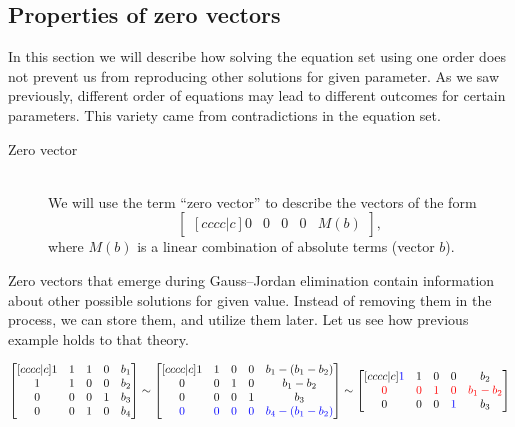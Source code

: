 \subsection{Properties of zero vectors}
In this section we will describe how solving the equation set using one order does not prevent us from reproducing other solutions for given parameter.
As we saw previously, different order of equations may lead to different outcomes for certain parameters.
This variety came from contradictions in the equation set.
\begin{description}
\item[Zero vector]\hfill\\
    We will use the term ``zero vector'' to describe the vectors of the form
    \begin{equation}
    \begin{bmatrix}[cccc|c]
        0 & 0 & 0 & 0 & M(b)
    \end{bmatrix},
    \end{equation}
    where $M(b)$ is a linear combination of absolute terms (vector $b$).
\end{description}
Zero vectors that emerge during Gauss--Jordan elimination contain information about other possible solutions for given value.
Instead of removing them in the process, we can store them, and utilize them later.
Let us see how previous example holds to that theory.

\begin{equation}
\begin{bmatrix}[cccc|c]
    1 & 1 & 1 & 0 & b_1 \\ 
    1 & 1 & 0 & 0 & b_2 \\ 
    0 & 0 & 0 & 1 & b_3 \\ 
    0 & 0 & 1 & 0 & b_4
\end{bmatrix}
\sim
\begin{bmatrix}[cccc|c]
    1 & 1 & 0 & 0 & b_1 - (b_1 - b_2) \\ 
    0 & 0 & 1 & 0 & b_1 - b_2 \\ 
    0 & 0 & 0 & 1 & b_3 \\ 
    \textcolor{blue}{0} & \textcolor{blue}{0} & \textcolor{blue}{0} & \textcolor{blue}{0} &\textcolor{blue}{b_4 - (b_1 - b_2)}
\end{bmatrix}
\sim
\begin{bmatrix}[cccc|c]
    \textcolor{blue}{1} & 1 & 0 & 0 & b_2 \\ 
    \textcolor{red}{0} & \textcolor{red}{0} & \textcolor{red}{1} & \textcolor{red}{0} & \textcolor{red}{b_1 - b_2} \\ 
    0 & 0 & 0 & \textcolor{blue}{1} & b_3 \\ 
\end{bmatrix}
\end{equation}

